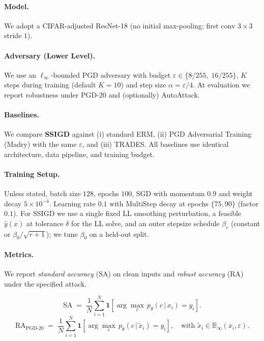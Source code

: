 \paragraph{Model.}
We adopt a CIFAR-adjusted ResNet-18 (no initial max-pooling; first conv $3\times3$ stride $1$). 

\paragraph{Adversary (Lower Level).}
We use an $\ell_\infty$-bounded PGD adversary with budget $\varepsilon \in \{8/255,\;16/255\}$, $K$ steps during training (default $K{=}10$) and step size $\alpha{=}\varepsilon/4$. At evaluation we report robustness under PGD-20 and (optionally) AutoAttack.

\paragraph{Baselines.}
We compare \textbf{SSIGD} against (i) standard ERM, (ii) PGD Adversarial Training (Madry) with the same $\varepsilon$, and (iii) TRADES. All baselines use identical architecture, data pipeline, and training budget.

\paragraph{Training Setup.}
Unless stated, batch size $128$, epochs $100$, SGD with momentum $0.9$ and weight decay $5{\times}10^{-4}$. Learning rate $0.1$ with MultiStep decay at epochs $\{75,90\}$ (factor $0.1$). For SSIGD we use a single fixed LL smoothing perturbation, a feasible $\hat y(x)$ at tolerance $\delta$ for the LL solve, and an outer stepsize schedule $\beta_r$ (constant or $\beta_0/\sqrt{r{+}1}$); we tune $\beta_0$ on a held-out split.

\paragraph{Metrics.}
We report \emph{standard accuracy} (SA) on clean inputs and \emph{robust accuracy} (RA) under the specified attack.

$$ \mathrm{SA} \;=\; \frac{1}{N}\sum_{i=1}^{N}\mathbf{1}\!\left[\arg\max_{c}\, p_\theta(c\,|\,x_i)=y_i\right]. $$
$$
\mathrm{RA}_{\text{PGD-}20} \;=\; \frac{1}{N}\sum_{i=1}^{N}\mathbf{1}\!\left[\arg\max_{c}\, p_\theta(c\,|\,\tilde x_i)=y_i\right],
\quad \text{with } \tilde x_i \in \mathbb{B}_\infty(x_i,\varepsilon).
$$
\vspace{0.5em}
